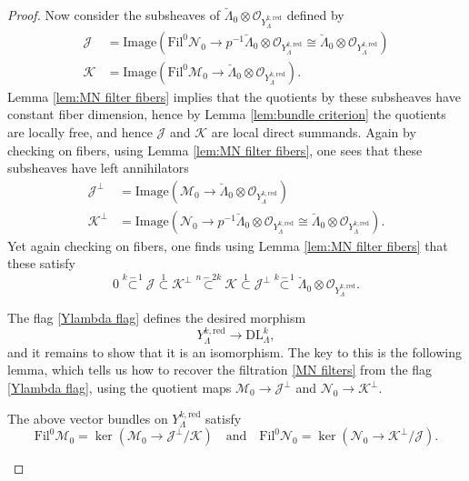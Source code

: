 \documentclass[11pt]{alggeom}
\newcommand{\iso}{\cong}
\newcommand{\red}{\mathrm{red}}
\newcommand{\co}{\mathcal O}
\begin{document}
\begin{proof}
Now consider the subsheaves  of $\breve{\Lambda}_0 \otimes \co_{Y^{k,\red}_\Lambda}$ defined by
 \begin{align*}
   \mathscr{J}  & = \mathrm{Image}(         \mathrm{Fil}^0 \mathscr{N}_0    \to  p^{-1}\breve{\Lambda}_0 \otimes \co_{Y^{k,\red}_\Lambda}  \iso \breve{\Lambda}_0 \otimes \co_{Y^{k,\red}_\Lambda}     ) \\
   \mathscr{K} & = \mathrm{Image}(   \mathrm{Fil}^0 \mathscr{M}_0    \to  \breve{\Lambda}_0 \otimes \co_{Y^{k,\red}_\Lambda}      ) .
 \end{align*}
 Lemma \ref{lem:MN filter fibers}  implies that the quotients by these subsheaves have constant fiber dimension, hence by Lemma \ref{lem:bundle criterion} the quotients are locally free, 
 and hence $ \mathscr{J}$ and $\mathscr{K}$ are local direct summands.
Again by checking on fibers, using  Lemma \ref{lem:MN filter fibers}, one sees that these subsheaves have left annihilators
 \begin{align*}
  \mathscr{J}^\perp & = \mathrm{Image}(   \mathscr{M}_0    \to  \breve{\Lambda}_0 \otimes \co_{Y^{k,\red}_\Lambda}      ) \\  
    \mathscr{K}^\perp & = \mathrm{Image}(   \mathscr{N}_0    \to  p^{-1}\breve{\Lambda}_0 \otimes \co_{Y^{k,\red}_\Lambda}   \iso \breve{\Lambda}_0 \otimes \co_{Y^{k,\red}_\Lambda}    ) .
\end{align*}
Yet again checking on fibers,  one finds using Lemma \ref{lem:MN filter fibers} that these satisfy 
\begin{equation}\label{Ylambda flag}
0 \stackrel{k-1}{\subset}  \mathscr{J} \stackrel{1}{\subset} \mathscr{K}^\perp 
\stackrel{n-2k}{\subset}      \mathscr{K} \stackrel{1}{\subset} \mathscr{J}^\perp \stackrel{k-1}{\subset}
 \breve{\Lambda}_0 \otimes \co_{Y^{k,\red}_\Lambda}     .
\end{equation}


The flag  \eqref{Ylambda flag} defines the desired morphism 
\begin{equation}\label{YtoDLconstruction}
Y^{k,\red}_\Lambda \to \mathrm{DL}_\Lambda^k,
\end{equation}
 and it remains to show that it is an isomorphism.  
 The key to this is the following lemma, which tells us how to recover the filtration \eqref{MN filters} from the flag \eqref{Ylambda flag}, using the quotient maps
 $\mathscr{M}_0 \to \mathscr{J}^\perp$ and  $\mathscr{N}_0 \to \mathscr{K}^\perp$.



\begin{lemma}\label{lem:miracle filtration}
The above vector bundles on $Y^{k,\red}_\Lambda$ satisfy
\[
 \mathrm{Fil}^0 \mathscr{M}_0  = \ker(  \mathscr{M}_0 \to \mathscr{J}^\perp / \mathscr{K} ) 
 \quad \mbox{and}\quad 
  \mathrm{Fil}^0 \mathscr{N}_0  = \ker(  \mathscr{N}_0 \to \mathscr{K}^\perp / \mathscr{J} ) .
\]
\end{lemma}



\end{proof}
\end{document}
